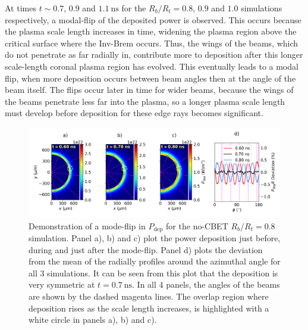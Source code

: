 At times $t\sim0.7$, $0.9$ and $1.1\ \text{ns}$ for the $R_b/R_t=0.8$, $0.9$ and $1.0$ simulations respectively, a modal-flip of the deposited power is observed.
This occurs because the plasma scale length increases in time, widening the plasma region above the critical surface where the \ac{Inv-Brem} occurs.
Thus, the wings of the beams, which do not penetrate as far radially in, contribute more to deposition after this longer scale-length coronal plasma region has evolved.
This eventually leads to a modal flip, when more deposition occurs between beam angles then at the angle of the beam itself.
The flips occur later in time for wider beams, because the wings of the beams penetrate less far into the plasma, so a longer plasma scale length must develop before deposition for these edge rays becomes significant.

\begin{figure}[t!]
    \includegraphics[width=\linewidth]{Results1/Images/NoCBET_modeflip.png}
    \centering
    \caption{Demonstration of a mode-flip in $P_{\text{dep}}$ for the no-\ac{CBET} $R_b/R_t=0.8$ simulation.
    Panel a), b) and c) plot the power deposition just before, during and just after the mode-flip.
    Panel d) plots the deviation from the mean of the radially profiles around the azimuthal angle for all 3 simulations.
    It can be seen from this plot that the deposition is very symmetric at $t=0.7\ \text{ns}$.
    In all 4 panels, the angles of the beams are shown by the dashed magenta lines.
    The overlap region where deposition rises as the scale length increases, is highlighted with a white circle in panels a), b) and c).}%
    \label{fig:Res1_Deposition_change}
\end{figure}

